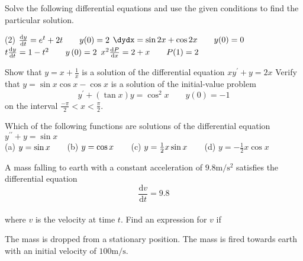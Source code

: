 \begin{Exercise}[title={Differential Equations},label=exDiffEqns]
	\Question Solve the following differential equations and use the given conditions to find the particular solution. 
	\begin{tasks}(2)
	\task $\frac{\mathrm{d}y}{\mathrm{d}t} =e^{t} +2 t\text{\quad \quad }y (0) =2$ %
	\task $\dydx =\sin  2 x +\cos  2 x\text{\quad \quad }y (0) =0$ %
	\task $t \frac{\mathrm{d}y}{\mathrm{d}t} =1 -t^{2}\text{\quad \quad }y \left (0\right ) =2$ %
	\task $x^{2} \frac{\mathrm{d} P}{\mathrm{d} x} =2 +x\text{\quad \quad }P (1) =2$ %
	\end{tasks}

\Question Show that $y =x +\frac{1}{x}$ is a solution of the differential equation $x y^{ \prime } +y =2 x$  %
\Question Verify that $y =\sin  x \cos  x -\cos  x$ is a solution of the initial-value problem
\begin{equation*}y^{ \prime } +\left (\tan  x\right ) y =\cos ^{2} x\qquad y (0) = -1
\end{equation*} on the interval $\frac{ -\pi }{2} <x <\frac{\pi }{2}$. %

\Question Which of the following functions are solutions of the differential
equation $y^{ \prime  \prime } +y =\sin  x$ \\\relax (a)  $y =\sin  x\text{\quad \quad }$(b)  $y =\cos  x\text{\quad \quad }$(c)  $y =\frac{1}{2} x \sin  x\text{\quad \quad }$(d)  $y = -\frac{1}{2} x \cos  x$ %

\Question A mass falling to earth with a constant acceleration of $9.8 \mathrm{m}/\mathrm{s}^{2}$ satisfies the differential equation
\begin{equation*}\frac{\mathrm{d} v}{\mathrm{d} t} =9.8
\end{equation*} \\\relax where $v$ is the velocity at time $t$.  Find an expression for $v$ if 
\begin{tasks}
	\task The mass is dropped from a stationary position. 
	\task The mass is fired towards earth with an initial velocity of $100 \mathrm{m}/\mbox{s}\text{.}$ \end{tasks}


\end{Exercise}
